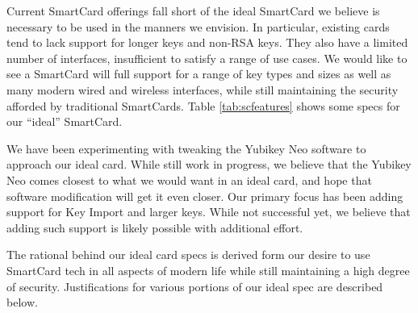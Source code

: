 \documentclass[11pt, twocolumn]{article}
\begin{document}
Current SmartCard offerings fall short of the ideal SmartCard we
believe is necessary to be used in the manners we envision. In
particular, existing cards tend to lack support for longer keys and
non-RSA keys. They also have a limited number of interfaces,
insufficient to satisfy a range of use cases. We would like to see a
SmartCard will full support for a range of key types and sizes as well
as many modern wired and wireless interfaces, while still maintaining
the security afforded by traditional SmartCards. Table \ref{tab:scfeatures}
shows some specs for our ``ideal'' SmartCard.

We have been experimenting with tweaking the Yubikey Neo software to
approach our ideal card. While still work in progress, we believe that
the Yubikey Neo comes closest to what we would want in an ideal card,
and hope that software modification will get it even closer. Our
primary focus has been adding support for Key Import and larger
keys. While not successful yet, we believe that adding such support is
likely possible with additional effort.

The rational behind our ideal card specs is derived form our desire to
use SmartCard tech in all aspects of modern life while still
maintaining a high degree of security. Justifications for various
portions of our ideal spec are described below.
\end{document}
